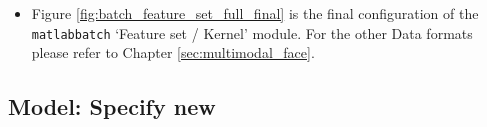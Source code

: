 \begin{itemize}
\begin{itemize}
			\begin{itemize}
			\item This is an optional step. In the `Voxels to include' options, the user can specify a `second-level' mask, which would define regions of interest (ROIs) on which the classification can be performed. In this case, select the `fusiform\_gyrus' mask.
			\end{itemize}
	
	\item In the `Detrend' field, select `Polynomial detrend' option with order 1.
	
	\item In the `Scale input scans' field, select `No scaling' option and finally leave `Use atlas to build ROI specific kernels' as default.
	
	\end{itemize}
	
	\item Figure \ref{fig:batch_feature_set_full_final} is the final configuration of the {\tt matlabbatch} `Feature set / Kernel' module. For the other Data formats please refer to Chapter \ref{sec:multimodal_face}.

\end{itemize}


\subsection{Model: Specify new}

